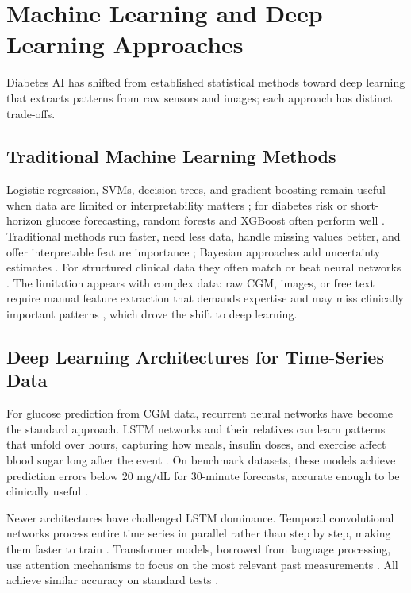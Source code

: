 \section{Machine Learning and Deep Learning Approaches}

Diabetes AI has shifted from established statistical methods toward deep learning that extracts patterns from raw sensors and images; each approach has distinct trade-offs.

\subsection{Traditional Machine Learning Methods}

Logistic regression, SVMs, decision trees, and gradient boosting remain useful when data are limited or interpretability matters \cite{contreras2018artificial, alam2024machine}; for diabetes risk or short-horizon glucose forecasting, random forests and XGBoost often perform well \cite{oikonomou2023machine, alam2024machine, alam2025machine}. Traditional methods run faster, need less data, handle missing values better, and offer interpretable feature importance \cite{alam2024machine}; Bayesian approaches add uncertainty estimates \cite{contreras2018artificial}. For structured clinical data they often match or beat neural networks \cite{oikonomou2023machine}. The limitation appears with complex data: raw CGM, images, or free text require manual feature extraction that demands expertise and may miss clinically important patterns \cite{zhu2021deep, alam2024machine}, which drove the shift to deep learning.

\subsection{Deep Learning Architectures for Time-Series Data}

For glucose prediction from CGM data, recurrent neural networks have become the standard approach. LSTM networks and their relatives can learn patterns that unfold over hours, capturing how meals, insulin doses, and exercise affect blood sugar long after the event \cite{zhu2021deep, prioleau2025deep, sun2021dualpathway}. On benchmark datasets, these models achieve prediction errors below 20 mg/dL for 30-minute forecasts, accurate enough to be clinically useful \cite{sun2021dualpathway, langarica2024deep, martinsson2020blood}.

Newer architectures have challenged LSTM dominance. Temporal convolutional networks process entire time series in parallel rather than step by step, making them faster to train \cite{zhu2021deep}. Transformer models, borrowed from language processing, use attention mechanisms to focus on the most relevant past measurements \cite{alam2024machine}. All achieve similar accuracy on standard tests \cite{prioleau2025deep}.

